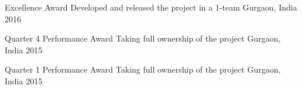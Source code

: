 



\begin{cvhonors}

  \cvhonor
    {Excellence Award} %
    {Developed and released the project in a 1-team} %
    {Gurgaon, India} %
    {2016} %

  \cvhonor
    {Quarter 4 Performance Award} %
    {Taking full ownership of the project} %
    {Gurgaon, India} %
    {2015} %

  \cvhonor
    {Quarter 1 Performance Award} %
    {Taking full ownership of the project} %
    {Gurgaon, India} %
    {2015} %

\end{cvhonors}
